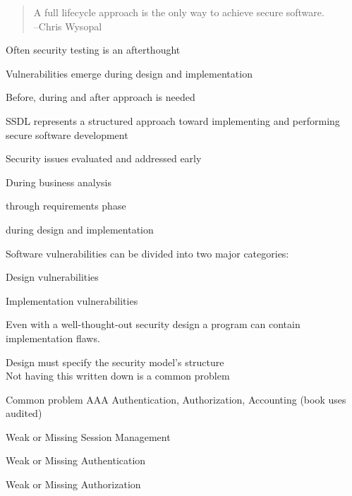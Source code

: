 \documentclass[Screen16to9,17pt]{foils}
\begin{document}

\begin{quote}
  A full lifecycle approach is the only way to achieve secure software.\\
  --Chris Wysopal
\end{quote}

\begin{list2}
\item Often security testing is an afterthought
\item Vulnerabilities emerge during design and implementation
\item Before, during and after approach is needed
\end{list2}


\begin{list2}
\item SSDL represents a structured approach toward implementing and performing secure software development
\item Security issues evaluated and addressed early
\item During business analysis
\item through requirements phase
\item during design and implementation
\end{list2}


Software vulnerabilities can be divided into two major categories:
\begin{list2}
\item Design vulnerabilities
\item Implementation vulnerabilities
\end{list2}

Even with a well-thought-out security design a program can contain implementation flaws.


\begin{list2}
\item Design must specify the security model's structure\\
Not having this written down is a common problem
\item Common problem AAA Authentication, Authorization, Accounting (book uses audited)
\item Weak or Missing Session Management
\item Weak or Missing Authentication
\item Weak or Missing Authorization
\end{list2}
\end{document}
